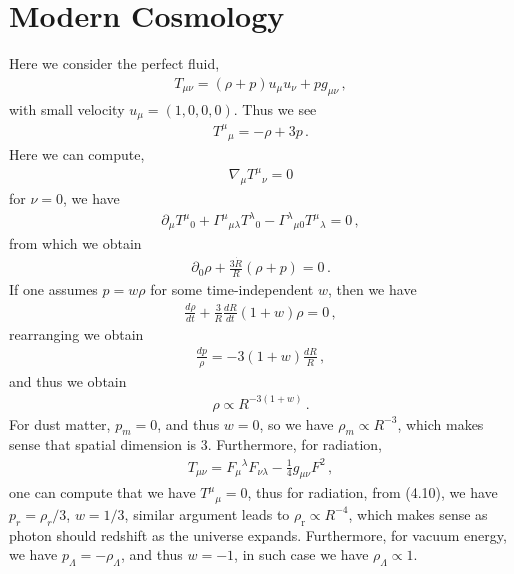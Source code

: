 \documentclass[11pt, onesided]{book}
\theoremstyle{break}
\theoremstyle{break}
\newcommand{\pd}{\partial}
\begin{document}
\section[Modern Cosmology]{\color{red} Modern Cosmology\color{black}}
Here we consider the perfect fluid,
\begin{align*}
T_{\mu\nu} = (\rho + p) u_\mu u_\nu + p g_{\mu\nu}\,,
\end{align*}
with small velocity $u_\mu = (1,0,0,0)$. Thus we see
\begin{align}
T^\mu{}_\mu = -\rho + 3p\,.
\end{align}
Here we can compute, 
\begin{align*}
\nabla_\mu T^\mu{}_\nu = 0
\end{align*}
for $\nu = 0$, we have
\begin{align*}
\pd_\mu T^\mu{}_0 + \Gamma^\mu{}_{\mu \lambda}T^\lambda{}_0 - \Gamma^\lambda{}_{\mu 0}T^\mu{}_\lambda = 0\,,
\end{align*}
from which we obtain
\begin{align*}
\pd_0 \rho + \frac{3\dot{R}}{R}\left( \rho + p\right) = 0\,.
\end{align*}
If one assumes $p = w\rho$ for some time-independent $w$, then we have
\begin{align*}
\frac{d\rho}{dt} + \frac{3}{R}\frac{dR}{dt}\left(1 + w\right) \rho = 0\,,
\end{align*}
rearranging we obtain
\begin{align*}
\frac{dp}{\rho} = -3(1+w) \frac{dR}{R}\,,
\end{align*}
and thus we obtain
\begin{align*}
\rho \propto R^{-3(1+w)}\,.
\end{align*} 
For dust matter, $p_m =0$, and thus $w = 0$, so we have $\rho_m \propto R^{-3}$, which makes sense that spatial dimension is $3$. Furthermore, for radiation, 
\begin{align*}
T_{\mu\nu} = F_\mu{}^\lambda F_{\nu\lambda} - \frac{1}{4}g_{\mu \nu}F^2\,,
\end{align*}
one can compute that we have $T^\mu{}_\mu = 0$, thus for radiation, from (4.10), we have $p_{r} = \rho_{r}/3$, $w = 1/3$, similar argument leads to $\rho_{\text{r}}\propto R^{-4}$, which makes sense as photon should redshift as the universe expands. Furthermore, for vacuum energy, we have $p_\Lambda = -\rho_\Lambda$, and thus $w = -1$, in such case we have $\rho_\Lambda \propto 1$. \\
\end{document}
